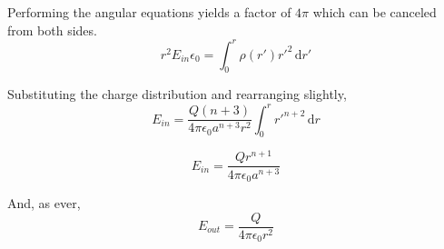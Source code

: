 \documentclass[10pt,a4paper]{article}
\begin{document}
Performing the angular equations yields a factor of $4\pi$ which can be canceled from both sides.
\begin{equation}
r^2E_{in}\epsilon_0 = \int_0^r \rho(r') r'^2 \,\mathrm{d}r'
\end{equation}

Substituting the charge distribution and rearranging slightly,
\begin{equation}
E_{in}=\frac{Q(n+3)}{4\pi\epsilon_0 a^{n+3}r^2}\int_0^r r'^{n+2} \,\mathrm{d}r
\end{equation}

\begin{equation}\boxed{
E_{in}=\frac{Qr^{n+1}}{4\pi\epsilon_0 a^{n+3}}
}\end{equation}

And, as ever,
\begin{equation}\boxed{
E_{out} = \frac{Q}{4\pi\epsilon_0 r^2}
}\end{equation}
\end{document}
